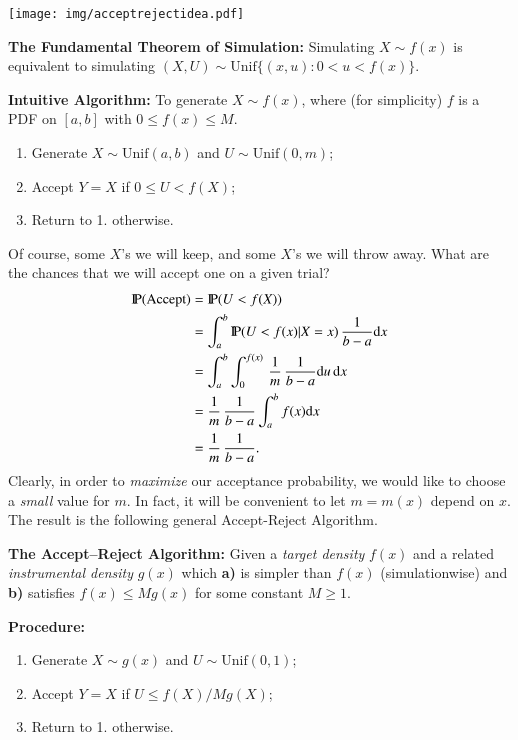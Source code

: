 \documentclass[11pt,english]{scrbook}
\begin{document}
\begin{center}
\begin{center}
\texttt{[image: img/acceptrejectidea.pdf]}
\end{center}

\end{center}

\textbf{The Fundamental Theorem of Simulation:} Simulating \(X\sim f(x)\) is equivalent to simulating \((X,U)\sim \mathrm{Unif}\{(x,u):0 < u < f(x)\}\).

\textbf{Intuitive Algorithm:} To generate \(X \sim f(x)\), where (for simplicity) \(f\) is a PDF on \([a,b]\) with \(0\leq f(x)\leq M\).
\begin{enumerate}
\item Generate \(X\sim\mathrm{Unif}(a,b)\) and \(U\sim\mathrm{Unif}(0,m)\);
\item Accept \(Y = X\) if \(0 \leq U < f(X)\);
\item Return to 1. otherwise.
\end{enumerate}

Of course, some \(X\)'s we will keep, and some \(X\)'s we will throw away. What are the chances that we will accept one on a given trial?
\begin{align*}
\mathrm{I\hspace{-1.5pt}P}(\mbox{Accept}) & =\mathrm{I\hspace{-1.5pt}P}(U < f(X))\\
 & =\int_{a}^{b}\mathrm{I\hspace{-1.5pt}P}(U < f(x)|X=x)\,\frac{1}{b-a}\mathrm{d} x\\
 & =\int_{a}^{b}\int_{0}^{f(x)}\,\frac{1}{m}\,\frac{1}{b-a}\mathrm{d} u\,\mathrm{d} x\\
 & =\frac{1}{m}\,\frac{1}{b-a}\int_{a}^{b}f(x)\mathrm{d} x\\
 & =\frac{1}{m}\,\frac{1}{b-a}.
\end{align*}
Clearly, in order to \emph{maximize} our acceptance probability, we would like to choose a \emph{small} value for \(m\). In fact, it will be convenient to let \(m=m(x)\) depend on \(x\). The result is the following general Accept-Reject Algorithm.

\textbf{The Accept--Reject Algorithm:} Given a \emph{target density} \(f(x)\) and a related \emph{instrumental density} \(g(x)\) which \textbf{a)} is simpler than \(f(x)\) (simulationwise) and \textbf{b)} satisfies \(f(x)\leq M g(x)\) for some constant \(M \geq 1\).

\textbf{Procedure:}
\begin{enumerate}
\item Generate \(X\sim g(x)\) and \(U \sim \mathrm{Unif}(0,1)\);
\item Accept \(Y=X\) if \(U\leq f(X)/M g(X)\);
\item Return to 1. otherwise.
\end{enumerate}
\end{document}
